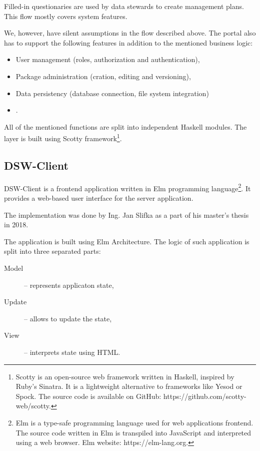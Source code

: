 Filled-in questionaries are used by data stewards to create management plans.
This flow mostly covers system features.

We, however, have silent assumptions in the flow described above.
The portal also has to support the following features in addition to the mentioned business logic:

\begin{itemize}
    \item User management (roles, authorization and authentication),
    \item Package administration (cration, editing and versioning),
    \item Data persistency (database connection, file system integration)
    \item {} .
\end{itemize}

All of the mentioned functions are split into independent Haskell modules.
The   layer is built using Scotty framework\footnote{Scotty is an open-source web framework written in Haskell, inspired by Ruby's Sinatra. It is a lightweight alternative to frameworks like Yesod or Spock. The source code is available on GitHub: https://github.com/scotty-web/scotty.}.

\subsection{DSW-Client}

DSW-Client is a frontend application written in Elm programming language\footnote{Elm is a type-safe programming language used for web applications frontend. The source code written in Elm is transpiled into JavaScript and interpreted using a web browser. Elm website: https://elm-lang.org.}.
It provides a web-based user interface for the server application.

The implementation was done by Ing. Jan Slifka as a part of his master's thesis in 2018.

The application is built using Elm Architecture.
The logic of such application is split into three separated parts:

\begin{description}
    \item[Model] -- represents applicaton state,
    \item[Update] -- allows to update the state,
    \item[View] -- interprets state using HTML.
\end{description}

